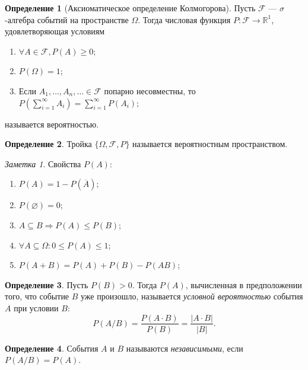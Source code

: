 \documentclass[a4paper,12pt]{article}
\let\emptyset\varnothing
\theoremstyle{remark}
\newtheorem*{note}{Заметка}
\theoremstyle{definition}
\newtheorem{definition}{Определение}
\begin{document}
\begin{definition}[Аксиоматическое определение Колмогорова]
	Пусть \(\mathcal{F}\) --- \(\sigma\)-алгебра событий на пространстве \(\Omega\). Тогда числовая функция \(P: \mathcal{F} \rightarrow \mathbb{R}^1\), удовлетворяющая условиям
	\begin{enumerate}
		\item \(\forall A \in \mathcal{F}, P(A) \geqslant 0\);
		\item \(P(\Omega) = 1\);
		\item Если \(A_1, \dots, A_n, \ldots \in \mathcal{F}\) попарно несовместны, то \(P \left(\sum^{\infty}_{i=1} A_i \right) = \sum^{\infty}_{i=1} P(A_i)\);
	\end{enumerate}
	называется вероятностью.
\end{definition}

\begin{definition}
	Тройка \(\{\Omega, \mathcal{F}, P\}\) называется вероятностным пространством.
\end{definition}

\begin{note}
Свойства \(P(A)\):
\begin{enumerate}
	\item \(P(A) = 1 - P(\overline{A})\);
	\item \(P(\emptyset) = 0\);
	\item \(A \subseteq B \Rightarrow P(A) \leqslant P(B)\);
	\item \(\forall A \subseteq \Omega: 0 \leqslant P(A) \leqslant 1\);
	\item \(P(A+B) = P(A) + P(B) - P(AB)\);
\end{enumerate}
\end{note}

\begin{definition}
	Пусть \(P(B) > 0\). Тогда \(P(A)\), вычисленная в предположении того, что событие \(B\) уже произошло, называется \emph{условной вероятностью} события \(A\) при условии \(B\):
	\begin{equation*}
		P(A / B) = \frac{P(A \cdot B)}{P(B)} = \frac{|A \cdot B|}{|B|}.
	\end{equation*}
\end{definition}

\begin{definition}
	События \(A\) и \(B\) называются \emph{независимыми}, если \(P(A/B) = P(A)\).
\end{definition}
\end{document}
